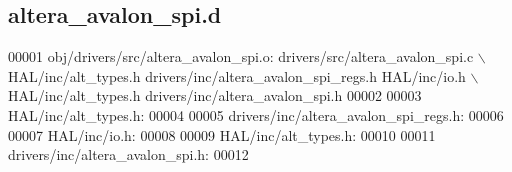 \subsection{altera\+\_\+avalon\+\_\+spi.\+d}
\label{altera__avalon__spi_8d_source}

\begin{DoxyCode}
00001 obj/drivers/src/altera\_avalon\_spi.o: drivers/src/altera\_avalon\_spi.c \(\backslash\)
 HAL/inc/alt\_types.h drivers/inc/altera\_avalon\_spi\_regs.h HAL/inc/io.h \(\backslash\)
 HAL/inc/alt\_types.h drivers/inc/altera\_avalon\_spi.h
00002 
00003 HAL/inc/alt\_types.h:
00004 
00005 drivers/inc/altera\_avalon\_spi\_regs.h:
00006 
00007 HAL/inc/io.h:
00008 
00009 HAL/inc/alt\_types.h:
00010 
00011 drivers/inc/altera\_avalon\_spi.h:
00012 \end{DoxyCode}

